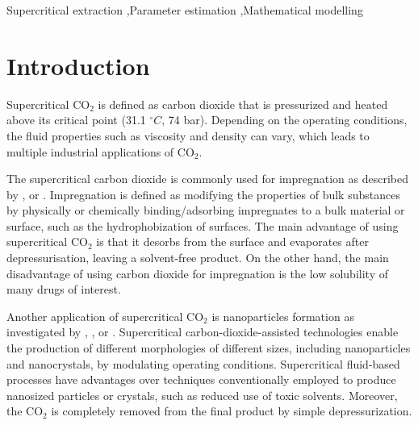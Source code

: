 \documentclass[a4paper,fleqn]{cas-dc}
\begin{document}
\begin{keywords}
Supercritical extraction \sep Parameter estimation \sep Mathematical modelling
\end{keywords}

\maketitle


\section{Introduction}

Supercritical CO$_2$ is defined as carbon dioxide that is pressurized and heated above its critical point (31.1 $^\circ C$, 74 bar). Depending on the operating conditions, the fluid properties such as viscosity and density can vary, which leads to multiple industrial applications of CO$_2$.
	
The supercritical carbon dioxide is commonly used for impregnation as described by \citet{Weidner2018}, \citet{Machado2022} or \citet{Fathi2022}. Impregnation is defined as modifying the properties of bulk substances by physically or chemically binding/adsorbing impregnates to a bulk material or surface, such as the hydrophobization of surfaces. The main advantage of using supercritical CO$_2$ is that it desorbs from the surface and evaporates after depressurisation, leaving a solvent-free product. On the other hand, the main disadvantage of using carbon dioxide for impregnation is the low solubility of many drugs of interest.
	
Another application of supercritical CO$_2$ is nanoparticles formation as investigated by \citet{Padrela2018}, \citet{Franco2021}, \citet{SaadatiArdestani2020} or \citet{Sodeifian2022}. Supercritical carbon-dioxide-assisted technologies enable the production of different morphologies of different sizes, including nanoparticles and nanocrystals, by modulating operating conditions. Supercritical fluid-based processes have advantages over techniques conventionally employed to produce nanosized particles or crystals, such as reduced use of toxic solvents. Moreover, the CO$_2$ is completely removed from the final product by simple depressurization.
	
\end{document}
